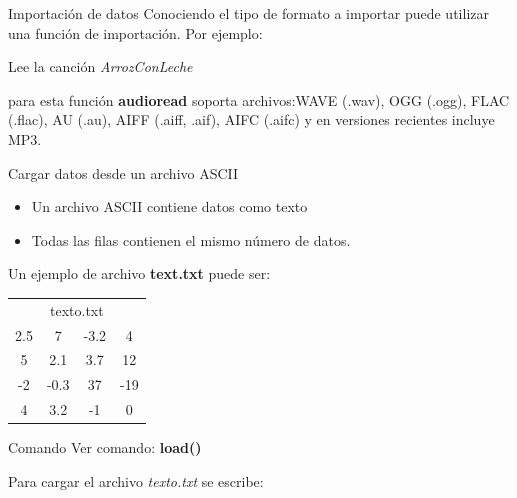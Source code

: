 \documentclass{bredelebeamer}
\begin{document}
\begin{frame}{Importación de datos}
Conociendo el tipo de formato a importar puede utilizar una función de importación. Por ejemplo:

\begin{center}

\end{center}
Lee la canción \textit{ArrozConLeche}\\
\begin{block}{para esta función}
\textbf{audioread} soporta archivos:WAVE (.wav),
OGG (.ogg),
FLAC (.flac),
AU (.au),
AIFF (.aiff, .aif),
AIFC (.aifc) y en versiones recientes incluye MP3.
\end{block}
\end{frame}

\begin{frame}{Cargar datos desde un archivo ASCII}
\begin{itemize}
\item Un archivo ASCII contiene datos como texto
\item Todas las filas contienen el mismo número de datos.
\end{itemize}
Un ejemplo de archivo \textbf{text.txt} puede ser:
\begin{table}[]
\centering
\begin{tabular}{cccc}
\multicolumn{4}{c}{texto.txt} \\
2.5   & 7      & -3.2  & 4    \\
5     & 2.1    & 3.7   & 12   \\
-2    & -0.3   & 37    & -19  \\
4     & 3.2    & -1    & 0   
\end{tabular}
\end{table}
\begin{exampleblock}{Comando}
Ver comando: \textbf{load()}
\end{exampleblock}
Para cargar el archivo \textit{texto.txt} se escribe:\\
\begin{center}

\end{center}
\end{frame}
\end{document}
